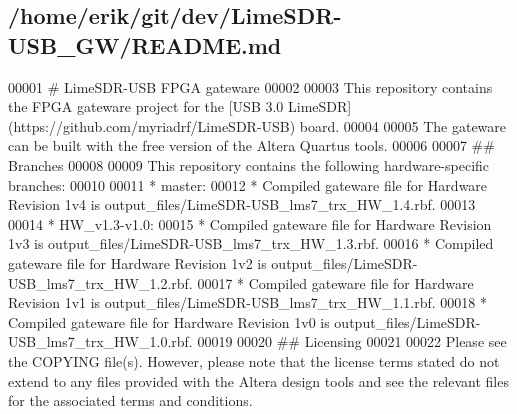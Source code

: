 \subsection{/home/erik/git/dev/\+Lime\+S\+D\+R-\/\+U\+S\+B\+\_\+\+G\+W/\+R\+E\+A\+D\+ME.md}

\begin{DoxyCode}
00001 # LimeSDR-USB FPGA gateware
00002 
00003 This repository contains the FPGA gateware project for the [USB 3.0
       LimeSDR](https://github.com/myriadrf/LimeSDR-USB) board.
00004 
00005 The gateware can be built with the free version of the Altera Quartus tools.
00006 
00007 ## Branches
00008 
00009 This repository contains the following hardware-specific branches:
00010 
00011 * master:
00012   * Compiled gateware file for Hardware Revision 1v4 is output\_files/LimeSDR-USB\_lms7\_trx\_HW\_1.4.rbf.
00013   
00014 * HW\_v1.3-v1.0:
00015   * Compiled gateware file for Hardware Revision 1v3 is output\_files/LimeSDR-USB\_lms7\_trx\_HW\_1.3.rbf.
00016   * Compiled gateware file for Hardware Revision 1v2 is output\_files/LimeSDR-USB\_lms7\_trx\_HW\_1.2.rbf.
00017   * Compiled gateware file for Hardware Revision 1v1 is output\_files/LimeSDR-USB\_lms7\_trx\_HW\_1.1.rbf.
00018   * Compiled gateware file for Hardware Revision 1v0 is output\_files/LimeSDR-USB\_lms7\_trx\_HW\_1.0.rbf.
00019 
00020 ## Licensing
00021 
00022 Please see the COPYING file(s). However, please note that the license terms stated do not extend to
       any files provided with the Altera design tools and see the relevant files for the associated terms and
       conditions.
\end{DoxyCode}
